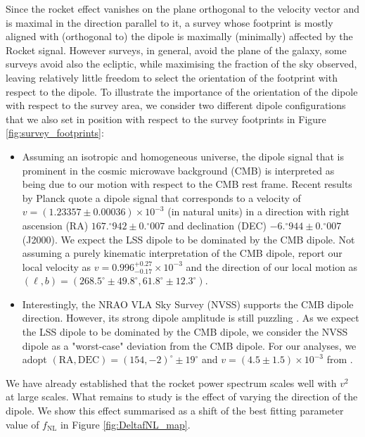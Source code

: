 \documentclass[a4paper,11pt]{article}
\begin{document}
Since the rocket effect vanishes on the plane orthogonal to the velocity vector and is maximal in the direction parallel to it, a survey whose footprint is mostly aligned with (orthogonal to) the dipole is maximally (minimally) affected by the Rocket signal. However surveys, in general, avoid the plane of the galaxy, some surveys avoid also the ecliptic, while maximising the fraction of the sky observed,  leaving relatively little freedom to select the orientation of the footprint with respect to the dipole.
To illustrate the importance of the orientation of the dipole with respect to the survey area, we consider two different dipole configurations that we also set in position with respect to the survey footprints in Figure \ref{fig:survey_footprints}:
\begin{itemize}
    \item Assuming an isotropic and homogeneous universe, the dipole signal that is prominent in the cosmic microwave background (CMB) is interpreted as being due to our motion with respect to the CMB rest frame. Recent results by Planck \cite{Akrami:2018vks} quote a dipole signal that corresponds to a velocity of $v=(1.23357 \pm 0.00036) \times 10^{-3}$ (in natural units) in a direction with right ascension (RA) $167.^\circ942 \pm 0.^\circ 007$ and declination (DEC) $-6.^\circ 944 \pm 0.^\circ 007$ (J2000). We expect the LSS dipole to be dominated by the CMB dipole. Not assuming a purely kinematic interpretation of the CMB dipole, \cite{Saha:2021bay} report our local velocity as $v = 0.996^{+0.27}_{-0.17} \times 10^{-3}$ and the direction of our local motion as $(\ell, b) = (268.5^\circ \pm 49.8^\circ, 61.8^\circ \pm 12.3^\circ)$.
    \item Interestingly, the NRAO VLA Sky Survey (NVSS) supports the CMB dipole direction. However, its strong dipole amplitude is still puzzling \cite{Blake:2002gx,Singal:2011dy,Gibelyou:2012ri,Rubart:2013tx,Kothari:2013gya,Tiwari:2013ima,Tiwari:2015tba}. As we expect the LSS dipole to be dominated by the CMB dipole, we consider the NVSS dipole as a "worst-case" deviation from the CMB dipole. For our analyses, we adopt $\mathrm{(RA,DEC)}=(154,-2)^\circ\pm 19^\circ$ and $v=(4.5\pm 1.5)\times 10^{-3}$ from \cite{Rubart:2013tx}.
\end{itemize}
We have already established that the rocket power spectrum scales well with $v^2$ at large scales. What remains to study is the effect of varying the direction of the dipole. We show this effect summarised as a shift of the best fitting parameter value of $f_\mathrm{NL}$ in Figure \ref{fig:DeltafNL_map}.
\end{document}
